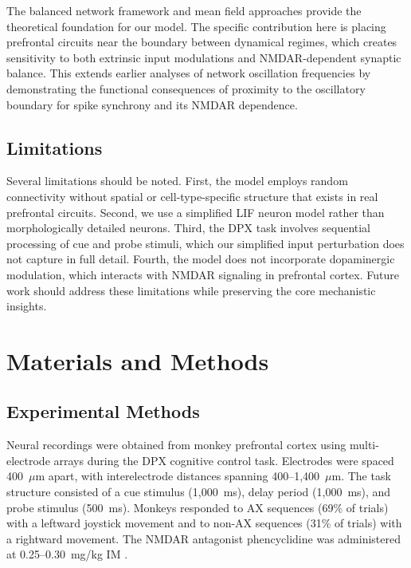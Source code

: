 \documentclass[10pt]{article}
\begin{document}
The balanced network framework \citep{vanvreeswijk1996chaos, brunel2000dynamics} and mean field approaches \citep{amit1997model, renart2003mean} provide the theoretical foundation for our model. The specific contribution here is placing prefrontal circuits near the boundary between dynamical regimes, which creates sensitivity to both extrinsic input modulations and NMDAR-dependent synaptic balance. This extends earlier analyses of network oscillation frequencies \citep{brunel2003fast, brunel1999fast} by demonstrating the functional consequences of proximity to the oscillatory boundary for spike synchrony and its NMDAR dependence.

\subsection{Limitations}

Several limitations should be noted. First, the model employs random connectivity without spatial or cell-type-specific structure that exists in real prefrontal circuits. Second, we use a simplified LIF neuron model rather than morphologically detailed neurons. Third, the DPX task involves sequential processing of cue and probe stimuli, which our simplified input perturbation does not capture in full detail. Fourth, the model does not incorporate dopaminergic modulation, which interacts with NMDAR signaling in prefrontal cortex. Future work should address these limitations while preserving the core mechanistic insights.

\section{Materials and Methods}

\subsection{Experimental Methods}

Neural recordings were obtained from monkey prefrontal cortex using multi-electrode arrays during the DPX cognitive control task. Electrodes were spaced 400~$\mu$m apart, with interelectrode distances spanning 400--1{,}400~$\mu$m. The task structure consisted of a cue stimulus (1{,}000~ms), delay period (1{,}000~ms), and probe stimulus (500~ms). Monkeys responded to AX sequences (69\% of trials) with a leftward joystick movement and to non-AX sequences (31\% of trials) with a rightward movement. The NMDAR antagonist phencyclidine was administered at 0.25--0.30~mg/kg IM \citep{zick2018blocking}.
\end{document}
